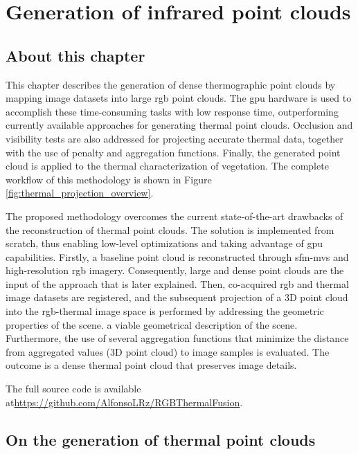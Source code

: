 \setchapterpreamble[u]{\margintoc}
\chapter{Generation of infrared point clouds}
\label{sec:thermal_pc}

\section*{About this chapter}

This chapter describes the generation of dense thermographic point clouds by mapping image datasets into large \acrshort{rgb} point clouds. The \acrshort{gpu} hardware is used to accomplish these time-consuming tasks with low response time, outperforming currently available approaches for generating thermal point clouds. Occlusion and visibility tests are also addressed for projecting accurate thermal data, together with the use of penalty and aggregation functions. Finally, the generated point cloud is applied to the thermal characterization of vegetation. The complete workflow of this methodology is shown in Figure \ref{fig:thermal_projection_overview}.

The proposed methodology overcomes the current state-of-the-art drawbacks of the reconstruction of thermal point clouds. The solution is implemented from scratch, thus enabling low-level optimizations and taking advantage of \acrshort{gpu} capabilities. Firstly, a baseline point cloud is reconstructed through \acrshort{sfm}-\acrshort{mvs} and high-resolution \acrshort{rgb} imagery. Consequently, large and dense point clouds are the input of the approach that is later explained. Then, co-acquired \acrshort{rgb} and thermal image datasets are registered, and the subsequent projection of a 3D point cloud into the \acrshort{rgb}-thermal image space is performed by addressing the geometric properties of the scene. a viable geometrical description of the scene. Furthermore, the use of several aggregation functions that minimize the distance from aggregated values (3D point cloud) to image samples is evaluated. The outcome is a dense thermal point cloud that preserves image details.

The full source code is available at\newline \small\url{https://github.com/AlfonsoLRz/RGBThermalFusion}.\normalsize

\section{On the generation of thermal point clouds}

